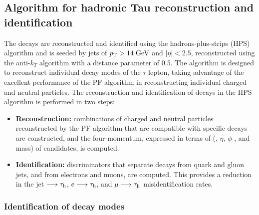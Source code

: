 \subsection{Algorithm for hadronic Tau reconstruction and identiﬁcation}

The \hadtau decays are reconstructed and identified using the hadrons-plus-strips (HPS) algorithm \cite{Chatrchyan:2012zz} and is seeded by jets of \ensuremath{\pt > 14 \gev} and \ensuremath{|\eta| < 2.5}, reconstructed using the anti-\ensuremath{k_{T}} algorithm \cite{antikt} with a distance parameter of 0.5. The algorithm is designed to reconstruct individual decay modes of the \ensuremath{\tau} lepton, taking advantage of the excellent performance of the PF algorithm in reconstructing individual charged and neutral particles.
The reconstruction and identification of \hadtau decays in the HPS algorithm is performed in two steps:


\begin{itemize}
	\item \textbf{Reconstruction:} combinations of charged and neutral particles reconstructed by the PF algorithm that are compatible with specific \hadtau decays are constructed, and the four-momentum, expressed in terms of (\pt, \ensuremath{\eta}, \ensuremath{\phi} , and mass) of \hadtau candidates, is computed.
	
	\item \textbf{Identification:} discriminators that separate \hadtau decays from quark and gluon jets, and from electrons and muons, are computed. This provides a reduction in the jet \ensuremath{\longrightarrow \hadtau}, \ensuremath{e \longrightarrow \hadtau}, and \ensuremath{\mu \longrightarrow \hadtau} misidentification rates.
\end{itemize}

\subsubsection{Identification of decay modes}

